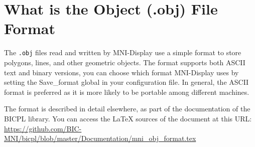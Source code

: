 \documentclass[11pt,letterpaper]{article}
\newcommand{\ident}[1]{{\tt #1}}
\newcommand{\display}{\mbox{MNI-Display}}
\begin{document}
\appendix









\section{What is the Object (.obj) File Format}

The \ident{.obj} files read and written by \display{} use a simple
format to store polygons, lines, and other geometric objects. The
format supports both ASCII text and binary versions, you can choose
which format \display{} uses by setting the Save\_format global in
your configuration file. In general, the ASCII format is preferred as
it is more likely to be portable among different machines.

The format is described in detail elsewhere, as part of the
documentation of the BICPL library. You can access the \LaTeX{}
sources of the document at this URL:
\url{https://github.com/BIC-MNI/bicpl/blob/master/Documentation/mni_obj_format.tex}
\end{document}
